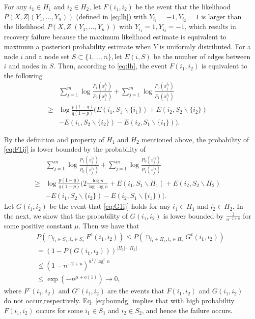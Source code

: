 \documentclass[conference]{IEEEtran}
\begin{document}
		For any $i_1\in H_1$ and $i_2\in H_2$, let $F(i_1,i_2)$ be the event that the likelihood $P(X,Z|(Y_1,\ldots,Y_n))$ (defined in \eqref{eq:lh}) with $Y_{i_1}=-1,Y_{i_2}=1$ is larger than the likelihood $P(X,Z|(Y_1,\ldots,Y_n))$ with $Y_{i_1}=1,Y_{i_2}=-1$, which results in  recovery failure because the maximum likelihood estimate is equivalent to maximum a posteriori probability estimate when $Y$ is uniformly distributed. For a node $i$ and a node set $S\subset\{1,\ldots,n\}, $let $E(i,S)$ be the number of edges between $i$ and nodes in $S$. Then, according to \eqref{eq:lh}, the event $F(i_1,i_2)$ is equivalent to  
		the following 
		\begin{align}
			&\sum_{j=1}^{m} \log \frac{P_1(x^{i_1}_{j})}{P_0(x^{i_1}_{j})}
			+\sum_{j=1}^{m} \log \frac{P_0(x^{i_2}_{j})}{P_1(x^{i_2}_{j})}\nonumber\\
			\ge &\log \frac{p(1-q)}{q(1-p)}(E(i_1, S_1 \backslash \{i_1\}) + E(i_2, S_2 \backslash \{i_2\})\nonumber\\
			&- E(i_1, S_2 \backslash \{i_2\}) - E(i_2, S_1 \backslash \{i_1\})) \label{eq:F1ij}.
		\end{align}
		
		By the definition and property of $H_1$ and $H_2$ mentioned above, the probability of \eqref{eq:F1ij} is lower bounded by the probability of
		\begin{align}
			&\sum_{j=1}^{m} \log \frac{P_1(x^{i_1}_{j})}{P_0(x^{i_1}_{j})}
			+\sum_{j=1}^{m} \log \frac{P_0(x^{i_2}_{j})}{P_1(x^{i_2}_{j})}\nonumber\\    
			\ge &\log \frac{p(1-q)}{q(1-p)}(2\frac{\log n}{\log\log n}+E(i_1, S_1 \backslash H_1) + E(i_2, S_2 \backslash H_2)\nonumber\\
			&- E(i_1, S_2 \backslash \{i_2\}) - E(i_2, S_1 \backslash \{i_1\})) \label{eq:G1ij}.
		\end{align}
		Let $G(i_1,i_2)$ be the event that \eqref{eq:G1ij} holds for any $i_1\in H_1$ and $i_2\in H_2$.
		In the next, we show that
		the probability of $G(i_1,i_2)$ is lower bounded by $\frac{1}{n^{-2+\mu}}$ for some positive constant $\mu$. Then we have that 
		\begin{align}
			& P(\cap_{i_1\in S_1, i_2\in S_2} F^c(i_1,i_2)) \le P(\cap_{i_1\in H_1, i_2\in H_2} G^c(i_1,i_2)) \nonumber\\
			& = (1 - P(G(i_1,i_2)))^{|H_1|\cdot|H_2|}\nonumber\\
			& \leq (1-n^{-2+u})^{n^2/\log^6 n} \nonumber\\
			& \leq \exp(-n^{\mu+ o(1)}) \to 0, \label{eq:boundg}
		\end{align}
		where $F^c(i_1,i_2)$ and $G^c(i_1,i_2)$ are the events that $F(i_1,i_2)$ and $G(i_1,i_2)$ do not occur,respectively. Eq. \eqref{eq:boundg} implies that with high probability $F(i_1,i_2)$ occurs for some $i_1\in S_1$ and $i_2\in S_2$, and hence the failure occurs.
		
\end{document}

